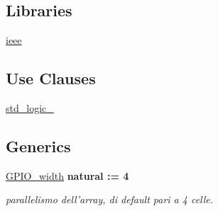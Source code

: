 \subsection*{Libraries}
 \begin{DoxyCompactItemize}
\item 
\hypertarget{class_g_p_i_oarray_ga0a6af6eef40212dbaf130d57ce711256}{\hyperlink{group___g_p_i_o-array_ga0a6af6eef40212dbaf130d57ce711256}{ieee} }\label{class_g_p_i_oarray_ga0a6af6eef40212dbaf130d57ce711256}

\end{DoxyCompactItemize}
\subsection*{Use Clauses}
 \begin{DoxyCompactItemize}
\item 
\hypertarget{class_g_p_i_oarray_gacd03516902501cd1c7296a98e22c6fcb}{\hyperlink{group___g_p_i_o-array_gacd03516902501cd1c7296a98e22c6fcb}{std\+\_\+logic\+\_}   }\label{class_g_p_i_oarray_gacd03516902501cd1c7296a98e22c6fcb}

\end{DoxyCompactItemize}
\subsection*{Generics}
 \begin{DoxyCompactItemize}
\item 
\hypertarget{class_g_p_i_oarray_ga0b52ca75e9a6093b2b60d5e851803069}{\hyperlink{group___g_p_i_o-array_ga0b52ca75e9a6093b2b60d5e851803069}{G\+P\+I\+O\+\_\+width} {\bfseries {\bfseries \textcolor{vhdlchar}{natural}\textcolor{vhdlchar}{ }\textcolor{vhdlchar}{ }\textcolor{vhdlchar}{\+:}\textcolor{vhdlchar}{=}\textcolor{vhdlchar}{ }\textcolor{vhdlchar}{ } \textcolor{vhdldigit}{4} \textcolor{vhdlchar}{ }}}}\label{class_g_p_i_oarray_ga0b52ca75e9a6093b2b60d5e851803069}

\begin{DoxyCompactList}\small\item\em parallelismo dell'array, di default pari a 4 celle. \end{DoxyCompactList}\end{DoxyCompactItemize}
